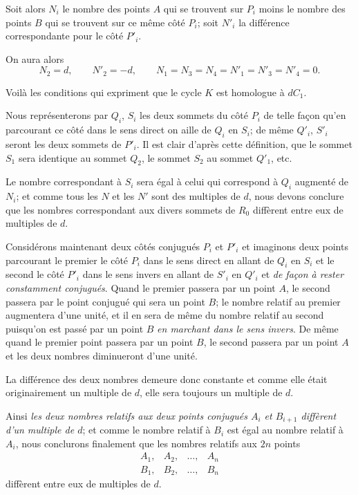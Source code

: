 \documentclass{article}
\begin{document}
Soit alors $N_{i}$ le nombre des points $A$ qui se trouvent sur $P_{i}$ moins le nombre des points $B$ qui se trouvent sur ce même côté $P_{i}$; soit $N'_{i}$ la différence correspondante pour le côté $P'_{i}$.

On aura alors
\[ N_{2} = d, \qquad N'_{2} = -d, \qquad N_{1} = N_{3} = N_{4} = N'_{1} = N'_{3} = N'_{4} = 0. \]

Voilà les conditions qui expriment que le cycle $K$ est homologue à $dC_{1}$.

Nous représenterons par $Q_{i}$, $S_{i}$ les deux sommets du côté $P_{i}$ de telle façon qu'en parcourant ce côté dans le sens direct on aille de $Q_{i}$ en $S_{i}$; de même $Q'_{i}$, $S'_{i}$ seront les deux sommets de $P'_{i}$. Il est clair d'après cette définition, que le sommet $S_{1}$ sera identique au sommet $Q_{2}$, le sommet $S_{2}$ au sommet $Q'_{1}$, etc.

Le nombre correspondant à $S_{i}$ sera égal à celui qui correspond à $Q_{i}$ augmenté de $N_{i}$; et comme tous les $N$ et les $N'$ sont des multiples de $d$, nous devons conclure que les nombres correspondant aux divers sommets de $R_{0}$ diffèrent entre eux de multiples de $d$.

Considérons maintenant deux côtés conjugués $P_{i}$ et $P'_{i}$ et imaginons deux points parcourant le premier le côté $P_{i}$ dans le sens direct en allant de $Q_{i}$ en $S_{i}$ et le second le côté $P'_{i}$ dans le sens invers en allant de $S'_{i}$ en $Q'_{i}$ et \emph{de façon à rester constamment conjugués}. Quand le premier passera par un point $A$, le second passera par le point conjugué qui sera un point $B$; le nombre relatif au premier augmentera d'une unité, et il en sera de même du nombre relatif au second puisqu'on est passé par un point $B$ \emph{en marchant dans le sens invers}. De même quand le premier point passera par un point $B$, le second passera par un point $A$ et les deux nombres diminueront d'une unité.


La différence des deux nombres demeure donc constante et comme elle était originairement un multiple de $d$, elle sera toujours un multiple de $d$.

Ainsi \emph{les deux nombres relatifs aux deux points conjugués $A_{i}$ et $B_{i+1}$ diffèrent d'un multiple de $d$}; et comme le nombre relatif à $B_{i}$ est égal au nombre relatif à $A_{i}$, nous conclurons finalement que les nombres relatifs aux $2n$ points
\[ \begin{matrix} A_{1}, & A_{2}, & \ldots, & A_{n} \\[1ex] B_{1}, & B_{2}, & \ldots, & B_{n} \end{matrix} \]
diffèrent entre eux de multiples de $d$.
\end{document}
